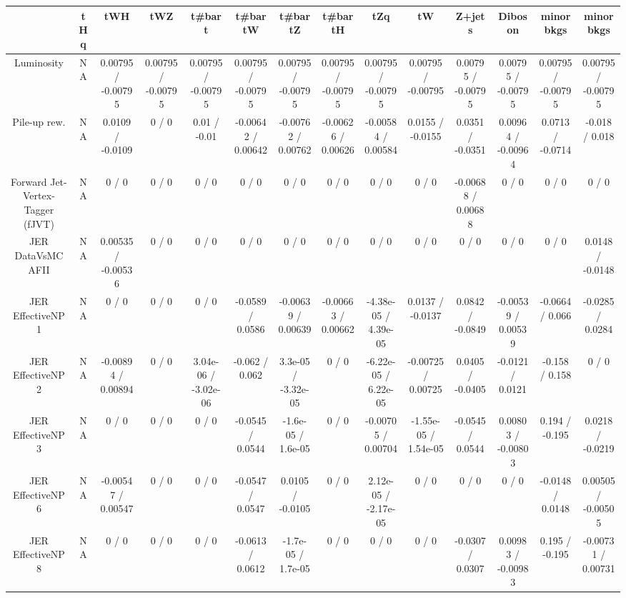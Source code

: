 \documentclass[10pt]{article}
\begin{document}
\begin{table}[htbp]
\begin{center}
\begin{tabular}{|c|c|c|c|c|c|c|c|c|c|c|c|c|c|}
\hline 
      & tHq      & tWH      & tWZ      & t#bar{t}      & t#bar{t}W      & t#bar{t}Z      & t#bar{t}H      & tZq      & tW      & Z+jets      & Diboson      & minor bkgs      & minor bkgs \\ 
\hline 
  Luminosity &    NA    & 0.00795 / -0.00795 & 0.00795 / -0.00795 & 0.00795 / -0.00795 & 0.00795 / -0.00795 & 0.00795 / -0.00795 & 0.00795 / -0.00795 & 0.00795 / -0.00795 & 0.00795 / -0.00795 & 0.00795 / -0.00795 & 0.00795 / -0.00795 & 0.00795 / -0.00795 & 0.00795 / -0.00795 \\ 
  Pile-up rew. &    NA    & 0.0109 / -0.0109 & 0 / 0 & 0.01 / -0.01 & -0.00642 / 0.00642 & -0.00762 / 0.00762 & -0.00626 / 0.00626 & -0.00584 / 0.00584 & 0.0155 / -0.0155 & 0.0351 / -0.0351 & 0.00964 / -0.00964 & 0.0713 / -0.0714 & -0.018 / 0.018 \\ 
  Forward Jet-Vertex-Tagger (fJVT) &    NA    & 0 / 0 & 0 / 0 & 0 / 0 & 0 / 0 & 0 / 0 & 0 / 0 & 0 / 0 & 0 / 0 & -0.00688 / 0.00688 & 0 / 0 & 0 / 0 & 0 / 0 \\ 
  JER DataVsMC AFII &    NA    & 0.00535 / -0.00536 & 0 / 0 & 0 / 0 & 0 / 0 & 0 / 0 & 0 / 0 & 0 / 0 & 0 / 0 & 0 / 0 & 0 / 0 & 0 / 0 & 0.0148 / -0.0148 \\ 
  JER EffectiveNP 1 &    NA    & 0 / 0 & 0 / 0 & 0 / 0 & -0.0589 / 0.0586 & -0.00639 / 0.00639 & -0.00663 / 0.00662 & -4.38e-05 / 4.39e-05 & 0.0137 / -0.0137 & 0.0842 / -0.0849 & -0.00539 / 0.00539 & -0.0664 / 0.066 & -0.0285 / 0.0284 \\ 
  JER EffectiveNP 2 &    NA    & -0.00894 / 0.00894 & 0 / 0 & 3.04e-06 / -3.02e-06 & -0.062 / 0.062 & 3.3e-05 / -3.32e-05 & 0 / 0 & -6.22e-05 / 6.22e-05 & -0.00725 / 0.00725 & 0.0405 / -0.0405 & -0.0121 / 0.0121 & -0.158 / 0.158 & 0 / 0 \\ 
  JER EffectiveNP 3 &    NA    & 0 / 0 & 0 / 0 & 0 / 0 & -0.0545 / 0.0544 & -1.6e-05 / 1.6e-05 & 0 / 0 & -0.00705 / 0.00704 & -1.55e-05 / 1.54e-05 & -0.0545 / 0.0544 & 0.00803 / -0.00803 & 0.194 / -0.195 & 0.0218 / -0.0219 \\ 
  JER EffectiveNP 6 &    NA    & -0.00547 / 0.00547 & 0 / 0 & 0 / 0 & -0.0547 / 0.0547 & 0.0105 / -0.0105 & 0 / 0 & 2.12e-05 / -2.17e-05 & 0 / 0 & 0 / 0 & 0 / 0 & -0.0148 / 0.0148 & 0.00505 / -0.00505 \\ 
  JER EffectiveNP 8 &    NA    & 0 / 0 & 0 / 0 & 0 / 0 & -0.0613 / 0.0612 & -1.7e-05 / 1.7e-05 & 0 / 0 & 0 / 0 & 0 / 0 & -0.0307 / 0.0307 & 0.00983 / -0.00983 & 0.195 / -0.195 & -0.00731 / 0.00731 \\ 

\end{tabular}
\end{center}
\end{table}
\end{document}
